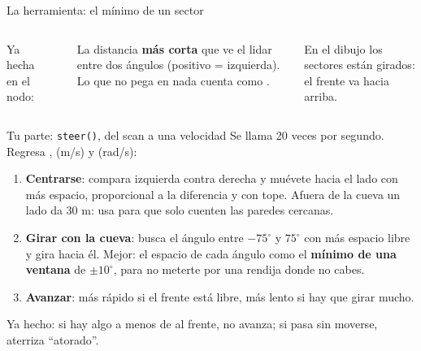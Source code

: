 \begin{frame}{La herramienta: el mínimo de un sector}
  \begin{columns}[c]
    \centering
    \small
    Ya hecha en el nodo:
    \begin{center}\end{center}
    La distancia \textbf{más corta} que ve el lidar entre dos ángulos (positivo = izquierda). Lo que no
    pega en nada cuenta como .
    \vspace{0.3em}

    \footnotesize En el dibujo los sectores están girados: el frente va hacia arriba.
  \end{columns}
\end{frame}

\begin{frame}{Tu parte: \texttt{steer()}, del scan a una velocidad}
  \small Se llama 20 veces por segundo. Regresa ,  (m/s) y  (rad/s):
  \begin{enumerate}
    \item \textbf{Centrarse}: compara izquierda contra derecha y muévete hacia el lado con más espacio,
      proporcional a la diferencia y con tope. Afuera de la cueva un lado da 30 m: usa
       para que solo cuenten las paredes cercanas.
    \item \textbf{Girar con la cueva}: busca el ángulo entre $-75^\circ$ y $75^\circ$ con más espacio libre y gira
      hacia él. Mejor: el espacio de cada ángulo como el \textbf{mínimo de una ventana} de $\pm10^\circ$,
      para no meterte por una rendija donde no cabes.
    \item \textbf{Avanzar}: más rápido si el frente está libre, más lento si hay que girar mucho.
  \end{enumerate}
  \begin{idea}
    \small Ya hecho: si hay algo a menos de  al frente, no avanza; si pasa
     sin moverse, aterriza ``atorado''.
  \end{idea}
\end{frame}

